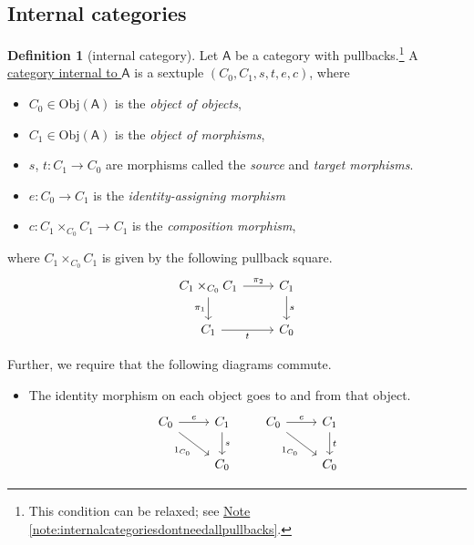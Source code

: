 \documentclass[a4paper,10pt]{scrreprt}
\newcommand{\defn}[1]{\ul{#1}}
\newcommand{\Obj}{\mathrm{Obj}}
\theoremstyle{definition}
\newtheorem{definition}{Definition}[section]
\theoremstyle{plain}
\theoremstyle{remark}
\begin{document}
\subsection{Internal categories}
\begin{definition}[internal category]
  \label{def:internalcategory}
  Let $\mathsf{A}$ be a category with pullbacks.\footnote{This condition can be relaxed; see \hyperref[note:internalcategoriesdontneedallpullbacks]{Note \ref*{note:internalcategoriesdontneedallpullbacks}}.} A \defn{category internal to $\mathsf{A}$} is a sextuple $(C_{0}, C_{1}, s, t, e, c)$, where
  \begin{itemize}
    \item $C_{0} \in \Obj(\mathsf{A})$ is the \emph{object of objects}, 
    \item $C_{1} \in \Obj(\mathsf{A})$ is the \emph{object of morphisms},
    \item $s$, $t\colon C_{1} \to C_{0}$ are morphisms called the \emph{source} and \emph{target morphisms}.
    \item $e\colon C_{0} \to C_{1}$ is the \emph{identity-assigning morphism}
    \item $c\colon C_{1} \times_{C_{0}} C_{1} \to C_{1}$ is the \emph{composition morphism},
  \end{itemize}
  where $C_{1} \times_{C_{0}} C_{1}$ is given by the following pullback square.
  \begin{equation*}
    \begin{tikzcd}
      C_{1} \times_{C_{0}} C_{1}
      \arrow[r, "\pi_{2}"]
      \arrow[d, swap, "\pi_{1}"]
      & C_{1}
      \arrow[d, "s"]
      \\
      C_{1}
      \arrow[r, swap, "t"]
      & C_{0}
    \end{tikzcd}
  \end{equation*}

  Further, we require that the following diagrams commute.
  \begin{itemize}
    \item The identity morphism on each object goes to and from that object.
      \begin{equation*}
        \begin{tikzcd}
          C_{0} 
          \arrow[r, "e"]
          \arrow[dr, swap, "1_{C_{0}}"]
          & C_{1} 
          \arrow[d, "s"]
          \\
          & C_{0}
        \end{tikzcd}
        \qquad
        \begin{tikzcd}
          C_{0} 
          \arrow[r, "e"]
          \arrow[dr, swap, "1_{C_{0}}"]
          & C_{1} 
          \arrow[d, "t"]
          \\
          & C_{0}
        \end{tikzcd}
      \end{equation*}


\end{itemize}
\end{definition}
\end{document}
